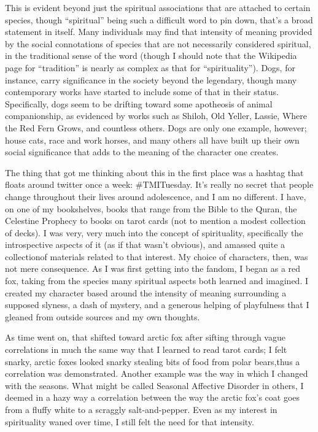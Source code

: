 This is evident beyond just the spiritual associations that are attached to certain species, though ``spiritual'' being such a difficult word to pin down, that's a broad statement in itself. Many individuals may find that intensity of meaning provided by the social connotations of species that are not necessarily considered spiritual, in the traditional sense of the word (though I should note that the Wikipedia page for ``tradition'' is nearly as complex as that for ``spirituality''). Dogs, for instance, carry significance in the society beyond the legendary, though many contemporary works have started to include some of that in their status. Specifically, dogs seem to be drifting toward some apotheosis of animal companionship, as evidenced by works such as Shiloh, Old Yeller, Lassie, Where the Red Fern Grows, and countless others. Dogs are only one example, however; house cats, race and work horses, and many others all have built up their own social significance that adds to the meaning of the character one creates.

The thing that got me thinking about this in the first place was a hashtag that floats around twitter once a week: \#TMITuesday. It's really no secret that people change throughout their lives around adolescence, and I am no different. I have, on one of my bookshelves, books that range from the Bible to the Quran, the Celestine Prophecy to books on tarot cards (not to mention a modest collection of decks). I was very, very much into the concept of spirituality, specifically the introspective aspects of it (as if that wasn't obvious), and amassed quite a collectionof materials related to that interest. My choice of characters, then, was not mere consequence. As I was first getting into the fandom, I began as a red fox, taking from the species many spiritual aspects both learned and imagined. I created my character based around the intensity of meaning surrounding a supposed slyness, a dash of mystery, and a generous helping of playfulness that I gleaned from outside sources and my own thoughts.

As time went on, that shifted toward arctic fox after sifting through vague correlations in much the same way that I learned to read tarot cards; I felt snarky, arctic foxes looked snarky stealing bits of food from polar bears,thus a correlation was demonstrated. Another example was the way in which I changed with the seasons. What might be called Seasonal Affective Disorder in others, I deemed in a hazy way a correlation between the way the arctic fox's coat goes from a fluffy white to a scraggly salt-and-pepper. Even as my interest in spirituality waned over time, I still felt the need for that intensity.

